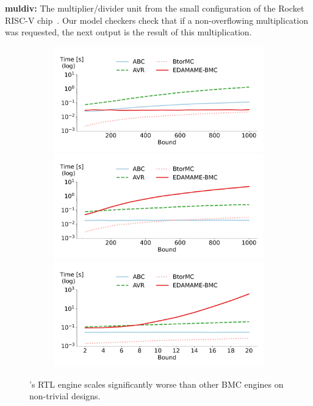 \documentclass[acmsmall,screen,review]{acmart}
\begin{document}
\textbf{muldiv:} The multiplier/divider unit from the small configuration of the
Rocket RISC-V chip~\cite{ucb2016rocket}. Our model checkers check that if a non-overflowing multiplication was requested, the next output is the result of this multiplication.

\begin{figure}
  \centering
  \begin{subfigure}{\columnwidth}
  \includegraphics[width=\columnwidth]{bmc-plots/mitre.pdf}
  \label{fig:benchmark-lin-s}
  \includegraphics[width=\columnwidth]{bmc-plots/fsm.pdf}
  \label{fig:benchmark-lin-l}
  \includegraphics[width=\columnwidth]{bmc-plots/MulDiv.pdf}
  \label{fig:benchmark-err-s}
  \end{subfigure}
  \caption{\toolname{}'s RTL engine scales significantly worse than other BMC engines on non-trivial designs.}\label{fig:benchmark-bmc}
\end{figure}  
\end{document}
